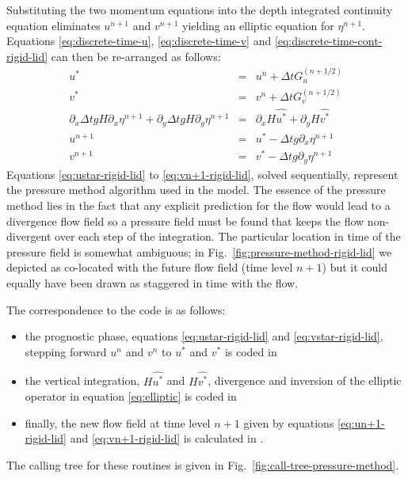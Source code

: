 Substituting the two momentum equations into the depth integrated
continuity equation eliminates $u^{n+1}$ and $v^{n+1}$ yielding an
elliptic equation for $\eta^{n+1}$. Equations
\ref{eq:discrete-time-u}, \ref{eq:discrete-time-v} and
\ref{eq:discrete-time-cont-rigid-lid} can then be re-arranged as follows:
\begin{eqnarray}
u^{*} & = & u^{n} + \Delta t G_u^{(n+1/2)} \label{eq:ustar-rigid-lid} \\
v^{*} & = & v^{n} + \Delta t G_v^{(n+1/2)} \label{eq:vstar-rigid-lid} \\
  \partial_x \Delta t g H \partial_x \eta^{n+1}
+ \partial_y \Delta t g H \partial_y \eta^{n+1}
& = &
  \partial_x H \widehat{u^{*}}
+ \partial_y H \widehat{v^{*}} \label{eq:elliptic}
\\
u^{n+1} & = & u^{*} - \Delta t g \partial_x \eta^{n+1} \label{eq:un+1-rigid-lid}\\
v^{n+1} & = & v^{*} - \Delta t g \partial_y \eta^{n+1} \label{eq:vn+1-rigid-lid}
\end{eqnarray}
Equations \ref{eq:ustar-rigid-lid} to \ref{eq:vn+1-rigid-lid}, solved
sequentially, represent the pressure method algorithm used in the
model. The essence of the pressure method lies in the fact that any
explicit prediction for the flow would lead to a divergence flow field
so a pressure field must be found that keeps the flow non-divergent
over each step of the integration. The particular location in time of
the pressure field is somewhat ambiguous; in
Fig.~\ref{fig:pressure-method-rigid-lid} we depicted as co-located
with the future flow field (time level $n+1$) but it could equally
have been drawn as staggered in time with the flow.

The correspondence to the code is as follows:
\begin{itemize}
\item
the prognostic phase, equations \ref{eq:ustar-rigid-lid} and \ref{eq:vstar-rigid-lid},
stepping forward $u^n$ and $v^n$ to $u^{*}$ and $v^{*}$ is coded in
\item
the vertical integration, $H \widehat{u^*}$ and $H
\widehat{v^*}$, divergence and inversion of the elliptic operator in
equation \ref{eq:elliptic} is coded in 
\item
finally, the new flow field at time level $n+1$ given by equations
\ref{eq:un+1-rigid-lid} and \ref{eq:vn+1-rigid-lid} is calculated in 
.
\end{itemize}
The calling tree for these routines is given in
Fig.~\ref{fig:call-tree-pressure-method}.



